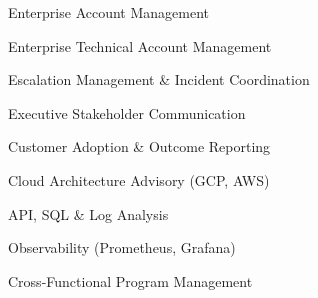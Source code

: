 \begin{skills}{Enterprise Account Management}
    \item Enterprise Technical Account Management
    \item Escalation Management \& Incident Coordination
    \item Executive Stakeholder Communication
    \item Customer Adoption \& Outcome Reporting
    \item Cloud Architecture Advisory (GCP, AWS)
    \item API, SQL \& Log Analysis
    \item Observability (Prometheus, Grafana)
    \item Cross-Functional Program Management
\end{skills}
